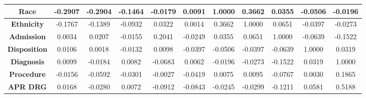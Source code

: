 \documentclass[10pt,twocolumn,letterpaper]{article}
\begin{document}
\begin{landscape}
\begin{table}[]
\begin{tabular}{|c|c|c|c|c|c|c|c|c|c|c|}
\textbf{Race}         & -0.2907                        & -0.2904                          & -0.1464                            & -0.0179                       & 0.0091                           & 1.0000                         & 0.3662                              & 0.0355                              & -0.0506                               & -0.0196                             \\ \hline
\textbf{Ethnicity}    & -0.1767                        & -0.1389                          & -0.0932                            & 0.0322                        & 0.0014                           & 0.3662                         & 1.0000                              & 0.0651                              & -0.0397                               & -0.0273                             \\ \hline
\textbf{Admission}    & 0.0034                         & 0.0207                           & -0.0155                            & 0.2041                        & -0.0249                          & 0.0355                         & 0.0651                              & 1.0000                              & -0.0639                               & -0.1522                             \\ \hline
\textbf{Disposition}  & 0.0106                         & 0.0018                           & -0.0132                            & 0.0098                        & -0.0397                          & -0.0506                        & -0.0397                             & -0.0639                             & 1.0000                                & 0.0319                              \\ \hline
\textbf{Diagnosis}    & 0.0099                         & -0.0184                          & 0.0082                             & -0.0683                       & 0.0062                           & -0.0196                        & -0.0273                             & -0.1522                             & 0.0319                                & 1.0000                              \\ \hline
\textbf{Procedure}    & -0.0156                        & -0.0592                          & -0.0301                            & -0.0027                       & -0.0419                          & 0.0075                         & 0.0095                              & -0.0767                             & 0.0030                                & 0.1865                              \\ \hline
\textbf{APR DRG}      & 0.0168                         & -0.0280                          & 0.0072                             & -0.0912                       & -0.0843                          & -0.0245                        & -0.0299                             & -0.1211                             & 0.0581                                & 0.5188                              \\ \hline

\end{tabular}
\end{table}
\end{landscape}
\end{document}
